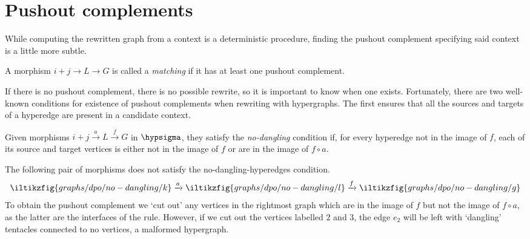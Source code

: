 \section{Pushout complements}

While computing the rewritten graph from a context is a deterministic procedure,
finding the pushout complement specifying said context
is a little more subtle.

\begin{definition}
    A morphism \(i+j \to L \to G\) is called a \emph{matching} if it
    has at least one pushout complement.
\end{definition}

If there is no pushout complement, there is no possible rewrite, so it is
important to know when one exists.
Fortunately, there are two well-known conditions for existence of pushout
complements when rewriting with hypergraphs.
The first ensures that all the sources and targets of a hyperedge are present
in a candidate context.

\begin{definition}
    Given morphisms \(i+j \xrightarrow{a} L \xrightarrow{f} G\) in
    \(\hypsigma\), they satisfy the \emph{no-dangling} condition if, for every
    hyperedge not in
    the image of \(f\), each of its source and target vertices is either not in
    the image of \(f\) or are in the image of \(f \circ a\).
\end{definition}

\begin{example}
    The following pair of morphisms does not satisfy the no-dangling-hyperedges
    condition.
    \[
        \iltikzfig{graphs/dpo/no-dangling/k}
        \xrightarrow{a}
        \iltikzfig{graphs/dpo/no-dangling/l}
        \xrightarrow{f}
        \iltikzfig{graphs/dpo/no-dangling/g}
    \]
    To obtain the pushout complement we `cut out' any vertices in the
    rightmost graph which are in the image of \(f\) but not the image of
    \(f \circ a\), as the latter are the interfaces of the rule.
    However, if we cut out the vertices labelled \(2\) and \(3\), the edge
    \(e_2\) will be left with `dangling' tentacles connected to no vertices, a
    malformed hypergraph.
    \begin{center}
    \end{center}
\end{example}

